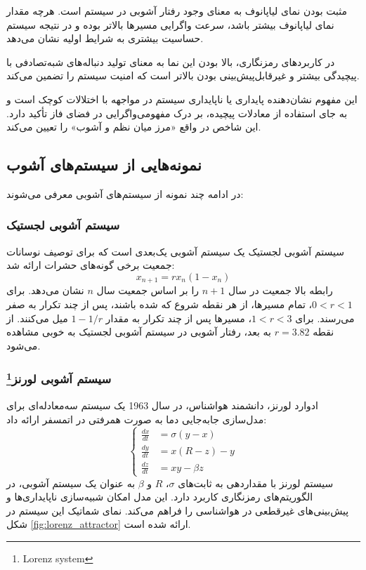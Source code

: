 \documentclass[a4paper,12pt]{report}
\renewcommand{\%}{\lr{\oldpercent}}
\providecommand{\LTRfootnote}[1]{\footnote{#1}}
\begin{document}
مثبت بودن نمای لیاپانوف به معنای وجود رفتار آشوبی در سیستم است. هرچه مقدار نمای لیاپانوف بیشتر باشد، سرعت واگرایی مسیرها بالاتر بوده و در نتیجه سیستم حساسیت بیشتری به شرایط اولیه نشان می‌دهد. 

در کاربردهای رمزنگاری، بالا بودن این نما به معنای تولید دنباله‌های شبه‌تصادفی با پیچیدگی بیشتر و غیرقابل‌پیش‌بینی بودن بالاتر است که امنیت سیستم را تضمین می‌کند. 

این مفهوم نشان‌دهنده پایداری یا ناپایداری سیستم در مواجهه با اختلالات کوچک است و به جای استفاده از معادلات پیچیده، بر درک مفهومی‌واگرایی در فضای فاز تأکید دارد. این شاخص در واقع «مرز میان نظم و آشوب» را تعیین می‌کند.

\subsection{نمونه‌هایی از سیستم‌های آشوب}
در ادامه چند نمونه از سیستم‌های آشوبی معرفی می‌شوند:

\subsubsection{سیستم آشوبی لجستیک}
سیستم آشوبی لجستیک یک سیستم آشوبی یک‌بعدی است که برای توصیف نوسانات جمعیت برخی گونه‌های حشرات ارائه شد:
\begin{equation} \label{eq:logistic}
x_{n+1} = r x_n (1 - x_n)
\end{equation}
رابطه بالا جمعیت در سال $n+1$ را بر اساس جمعیت سال $n$ نشان می‌دهد. برای $0 < r < 1$، تمام مسیرها، از هر نقطه شروع که شده باشند، پس از چند تکرار به صفر می‌رسند. برای $1 < r < 3$، مسیرها پس از چند تکرار به مقدار $1-1/r$ میل می‌کنند. از نقطه $r=3.82$ به بعد، رفتار آشوبی در سیستم آشوبی لجستیک به خوبی مشاهده می‌شود\cite{ref14}.

\subsubsection[سیستم آشوبی لورنز]{سیستم آشوبی لورنز\LTRfootnote{Lorenz system}}
ادوارد لورنز، دانشمند هواشناس، در سال 1963 یک سیستم سه‌معادله‌ای برای مدل‌سازی جابه‌جایی دما به صورت همرفتی در اتمسفر ارائه داد:
\begin{equation} \label{eq:lorenz}
\left\{ \begin{aligned}
\frac{dx}{dt} &= \sigma (y - x) \\
\frac{dy}{dt} &= x (R - z) - y \\
\frac{dz}{dt} &= xy - \beta z
\end{aligned} \right.
\end{equation}
سیستم لورنز با مقداردهی به ثابت‌های $\sigma$، $R$ و $\beta$ به عنوان یک سیستم آشوبی، در الگوریتم‌های رمزنگاری کاربرد دارد. این مدل امکان شبیه‌سازی ناپایداری‌ها و پیش‌بینی‌های غیرقطعی در هواشناسی را فراهم می‌کند\cite{ref15, ref16}. نمای شماتیک این سیستم در شکل \ref{fig:lorenz_attractor} ارائه شده است.
\end{document}
